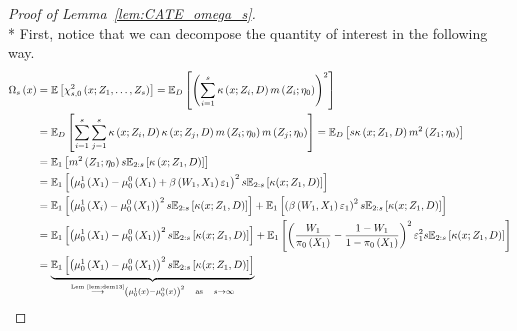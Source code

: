 \begin{proof}[Proof of Lemma~\ref{lem:CATE_omega_s}]\mbox{}\\*
    First, notice that we can decompose the quantity of interest in the following way.
	\begin{equation}
		\begin{aligned}
			\Omega_{s}\left(x\right)
			& = \E\left[\chi_{s,0}^{2}\left(x; Z_1, \ldots,  Z_{s}\right)\right]
            = \E_{D}\left[\left(\sum_{i = 1}^{s} \kappa\left(x; Z_{i}, D\right) m\left(Z_{i}; \eta_{0}\right)\right)^2\right]\\
            & = \E_{D}\left[\sum_{i = 1}^{s}\sum_{j = 1}^{s}\kappa\left(x; Z_{i}, D\right)\kappa\left(x; Z_{j}, D\right)
            m\left(Z_{i}; \eta_{0}\right)m\left(Z_{j}; \eta_{0}\right)\right]
            = \E_{D}\left[s \kappa\left(x; Z_1, D\right)  m^2\left(Z_{1}; \eta_{0}\right)\right] \\
            & = \E_{1}\left[ m^2\left(Z_{1}; \eta_{0}\right) s \E_{2:s}\left[\kappa\left(x; Z_1, D\right)\right]\right]\\
            & = \E_{1}\left[\left(\mu_{0}^{1}\left(X_{1}\right) - \mu_{0}^{0}\left(X_{1}\right) + \beta\left(W_{1}, X_{1}\right)\varepsilon_{1}\right)^2 s \E_{2:s}\left[\kappa(x; Z_1, D)\right]\right]                                                                                             \\
			& = \E_{1}\left[\left(\mu_{0}^{1}\left(X_{i}\right) - \mu_{0}^{0}\left(X_{1}\right)\right)^2 s \E_{2:s}\left[\kappa(x; Z_1, D)\right]\right]
			+ \E_{1}\left[\left(\beta\left(W_{1}, X_{1}\right)\varepsilon_{1}\right)^2 s \E_{2:s}\left[\kappa(x; Z_1, D)\right]\right]\\
		      & =  \E_{1}\left[\left(\mu_{0}^{1}\left(X_{1}\right) - \mu_{0}^{0}\left(X_{1}\right)\right)^2 s \E_{2:s}\left[\kappa(x; Z_1, D)\right]\right]
			+ \E_{1}\left[\left(\frac{W_{1}}{\pi_{0}\left(X_1\right)} - \frac{1 - W_{1}}{1 - \pi_{0}\left(X_1\right)}\right)^2 \varepsilon_{1}^2 s \E_{2:s}\left[\kappa(x; Z_1, D)\right]\right]                                                                                               \\
			& = \underbrace{\E_{1}\left[\left(\mu_{0}^{1}\left(X_{1}\right) - \mu_{0}^{0}\left(X_{1}\right)\right)^2 s \E_{2:s}\left[\kappa(x; Z_1, D)\right]\right]}_{\overset{\text{Lem \ref{lem:dem13}}}{\longrightarrow} \left(\mu_{0}^{1}\left(x\right) - \mu_{0}^{0}\left(x\right)\right)^2 \quad \text{as} \quad s \rightarrow \infty}

\end{aligned}
\end{equation}
\end{proof}
